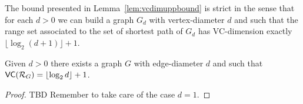 The bound presented in Lemma~\ref{lem:vcdimuppbound} is strict in the sense that
for each $d>0$ we can build a graph $G_d$ with vertex-diameter $d$ and such
that the range set associated to the set of shortest path of $G_d$ has
VC-dimension exactly $\lfloor\log_2(d+1)\rfloor+1$.

\begin{lemma}
  Given $d>0$ there exists a graph $G$ with edge-diameter $d$ and such that
  $\mathsf{VC}(\mathcal{R}_G)=\lfloor\log_2 d\rfloor+1$.
\end{lemma}

\begin{proof}
  \XXX TBD Remember to take care of the case $d=1$.
\end{proof}

